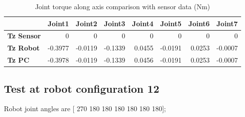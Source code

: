 \begin{table}[h!]
	\centering
	\caption{Joint torque along axis comparison with sensor data (Nm)}
	\label{wrech_Sensor_Pose11}
	\begin{tabular}{|l|r|r|r|r|r|r|r|}
		\hline
		\textbf{} & \textbf{Joint1} & \textbf{Joint2} & \textbf{Joint3} & \textbf{Joint4} & \textbf{Joint5} & \textbf{Joint6} & \textbf{Joint7} \\ \hline
		\textbf{Tz Sensor}  & 0           & 0           & 0            & 0           & 0           & 0           & 0           \\ \hline
		\textbf{Tz Robot}  	& -0.3977           & -0.0119           & -0.1339            & 0.0455           & -0.0191           & 0.0253           & -0.0007           \\ \hline
		\textbf{Tz PC}  	& -0.3978           & -0.0119           & -0.1339            & 0.0456           & -0.0191           & 0.0253           & -0.0007           \\ \hline
	\end{tabular}
\end{table}


\subsection{Test at robot configuration 12}
Robot joint angles are  [ 270  180  180  180  180  180  180];

